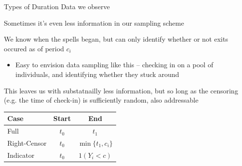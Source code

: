 \documentclass[notes,11pt, aspectratio=169]{beamer}
\newenvironment{wideitemize}{\itemize\addtolength{\itemsep}{10pt}}{\enditemize}
\begin{document}
\begin{frame}{Types of Duration Data we observe}
  \begin{wideitemize}
  \item Sometimes it's even less information in our sampling scheme
  \item We know when the spells began, but can only identify whether
    or not exits occured as of period $c_{i}$
    \begin{itemize}
    \item Easy to envision data sampling like this -- checking in on a
      pool of individuals, and identifying whether they stuck around
    \end{itemize}
  \item This leaves us with substatnailly less information, but so
    long as the censoring (e.g. the time of check-in) is sufficiently
    random, also addressable
  \end{wideitemize}
  \begin{center}
    \begin{tabular}{lcc}
      Case & Start & End\\
      \midrule
      Full & $t_{0}$ & $t_{1}$\\
      Right-Censor & $t_{0}$ & $\min\{{t_{1}, c_{i}}\}$\\
      Indicator   & $t_{0}$ & $1(Y_{i} < c)$\\            
    \end{tabular}
\end{center}
\end{frame}
\end{document}
